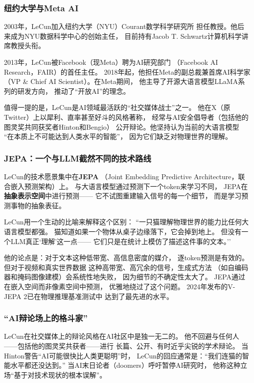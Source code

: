 \subsubsection{纽约大学与Meta AI}
2003年，LeCun加入纽约大学（NYU）Courant数学科学研究所
担任教授。他后来成为NYU数据科学中心的创始主任，
目前持有Jacob T. Schwartz计算机科学讲席教授头衔。

2013年，LeCun被Facebook（现Meta）聘为AI研究部门
（Facebook AI Research，FAIR）的首任主任。
2018年起，他担任Meta的副总裁兼首席AI科学家
（VP \& Chief AI Scientist）。在Meta期间，
他主导了开源大语言模型LLaMA系列的研发方向，
推动了``开放AI''的理念。

值得一提的是，LeCun是AI领域最活跃的``社交媒体战士''之一。
他在X（原Twitter）上以犀利、直率甚至好斗的风格著称，
经常与AI安全倡导者（包括他的图灵奖共同获奖者Hinton和Bengio）
公开辩论。他坚持认为当前的大语言模型
``在本质上不可能达到人类水平的智能''，
因为它们缺乏对物理世界的理解。

\subsubsection{JEPA：一个与LLM截然不同的技术路线}
LeCun的技术愿景集中在\textbf{JEPA}
（Joint Embedding Predictive Architecture，联合嵌入预测架构）上。
与大语言模型通过预测下一个token来学习不同，
JEPA在\textbf{抽象表示空间}中进行预测——
它不试图重建输入信号的每一个细节，
而是学习预测事物的抽象表征。

LeCun用一个生动的比喻来解释这个区别：
``一只猫理解物理世界的能力比任何大语言模型都强。
猫知道如果一个物体从桌子边缘落下，它会掉到地上。
但没有一个LLM真正`理解'这一点——
它们只是在统计上模仿了描述这件事的文本。''

他的论点是：对于文本这种低带宽、高信息密度的媒介，
逐token预测是有效的。但对于视频和真实世界数据
这种高带宽、高冗余的信号，生成式方法
（如自编码器和掩码图像建模）会系统性地失败，
因为细节的不确定性太大了。
JEPA通过在嵌入空间而非像素空间中预测，
优雅地绕过了这个问题。
2024年发布的V-JEPA 2已在物理推理基准测试中
达到了最先进的水平。

\subsubsection{``AI辩论场上的格斗家''}
LeCun在社交媒体上的辩论风格在AI社区中是独一无二的。
他不回避与任何人——包括他的图灵奖共获者——进行
长篇、公开、有时近乎尖锐的学术辩论。
当Hinton警告``AI可能很快比人类更聪明''时，
LeCun的回应通常是：``我们连猫的智能水平都还没达到。''
当AI末日论者（doomers）呼吁暂停AI研究时，
他称这种立场``基于对技术现状的根本误解''。

